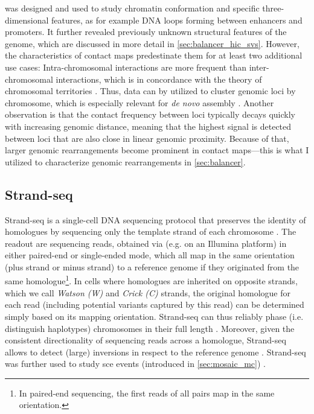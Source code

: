 
\hic was designed and used to study chromatin conformation and specific
three-dimensional features, as for example DNA loops forming between enhancers and
promoters. It further revealed previously unknown structural features of the
genome, which are discussed in more detail in \cref{sec:balancer_hic_svs}.
However, the characteristics of \hic contact maps predestinate them for at least
two additional use cases: Intra-chromosomal interactions are more frequent than
inter-chromosomal interactions, which is in concordance with the theory of
chromosomal territories \citep{Cremer2001}. Thus, \hic data can by utilized to
cluster genomic loci by chromosome, which is especially relevant for \textit{de
novo} assembly \citep{Burton2013}. Another observation is that the contact
frequency between loci typically decays quickly with increasing genomic
distance, meaning that the highest signal is detected between loci that are also
close in linear genomic proximity. Because of that, larger genomic
rearrangements become prominent in contact maps---this is what I utilized
to characterize genomic rearrangements in \cref{sec:balancer}.





\subsection{Strand-seq}
\label{sec:strandseq}

Strand-seq is a single-cell DNA sequencing protocol that preserves the identity
of homologues by sequencing only the template strand of each chromosome
\citep{Falconer2012,Sanders2017}. The readout are sequencing reads, obtained via
\mps (e.g. on an Illumina platform) in either paired-end or single-ended mode,
which all map in the same orientation (plus strand or minus strand) to a
reference genome if they originated from the same homologue\footnote{In paired-end
sequencing, the first reads of all pairs map in the same orientation.}. In cells where
homologues are inherited on opposite strands, which we call \emph{Watson (W)} and \emph{Crick (C)}
strands, the original homologue for each read (including potential variants
captured by this read) can be determined simply based
on its mapping orientation. Strand-seq can thus reliably phase (i.e. distinguish
haplotypes) chromosomes in their full length \citep{Porubsky2016}. Moreover,
given the consistent directionality of sequencing reads across a homologue,
Strand-seq allows to detect (large) inversions in respect to the reference
genome \citep{Sanders2016}. Strand-seq was further used to study \acl{sce} events
(introduced in \cref{sec:mosaic_mc}) \citep{Falconer2012}.

